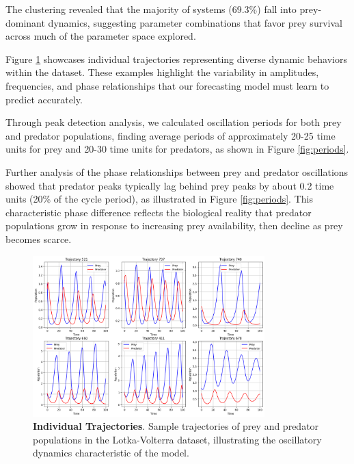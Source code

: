 \documentclass{article}
\begin{document}
The clustering revealed that the majority of systems (69.3\%) fall into prey-dominant dynamics, suggesting parameter combinations that favor prey survival across much of the parameter space explored.

Figure \ref{fig:trajectories} showcases individual trajectories representing diverse dynamic behaviors within the dataset. These examples highlight the variability in amplitudes, frequencies, and phase relationships that our forecasting model must learn to predict accurately.

Through peak detection analysis, we calculated oscillation periods for both prey and predator populations, finding average periods of approximately 20-25 time units for prey and 20-30 time units for predators, as shown in Figure \ref{fig:periods}.

Further analysis of the phase relationships between prey and predator oscillations showed that predator peaks typically lag behind prey peaks by about 0.2 time units (20\% of the cycle period), as illustrated in Figure \ref{fig:periods}. This characteristic phase difference reflects the biological reality that predator populations grow in response to increasing prey availability, then decline as prey becomes scarce.

\begin{figure}[H]
    \centering
    \includegraphics[width=0.8\textwidth]{sample}
    \caption{\textbf{Individual Trajectories}. Sample trajectories of prey and predator populations in the Lotka-Volterra dataset, illustrating the oscillatory dynamics characteristic of the model.}
    \label{fig:trajectories}
\end{figure}
\end{document}
